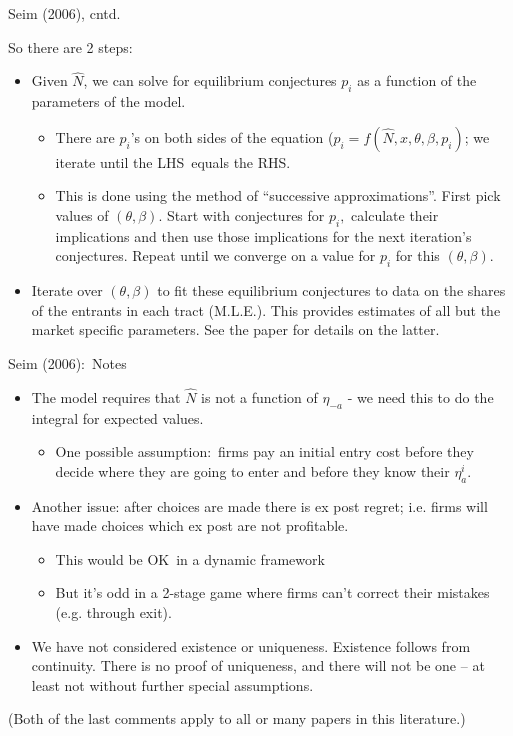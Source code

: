 \documentclass[xcolor=pdftex,dvipsnames,table,mathserif]{beamer}
\begin{document}
\begin{frame}{Seim (2006), cntd.}

So there are 2 steps:
\begin{itemize}
\item Given $\hat{N}$, we can solve for equilibrium conjectures $p_{i}$ as a
function of the parameters of the model.
\begin{itemize}
\item There are $p_{i}$'s on both sides of the equation ($p_{i}=f(\hat{N}%
,x,\theta ,\beta ,p_{i})$; we iterate until the LHS\ equals the RHS.
\item This is done using the method of \textquotedblleft successive
approximations\textquotedblright . First pick values of $(\theta ,\beta )$.
Start with conjectures for $p_{i},$ calculate their implications and then
use those implications for the next iteration's conjectures. Repeat until we
converge on a value for $p_{i}$ for this $(\theta ,\beta ).$
\end{itemize}
\item Iterate over $(\theta ,\beta )$ to fit these equilibrium conjectures
to data on the shares of the entrants in each tract (M.L.E.). This provides
estimates of all but the market specific parameters. See the paper for
details on the latter.
\end{itemize}
\end{frame}


\begin{frame}{Seim (2006):\ Notes}
\begin{itemize}
\item The model requires that $\hat{N}$ is not a function of $\eta _{-a}$ -
we need this to do the integral for expected values.
\begin{itemize}
\item One possible assumption:\ firms pay an initial entry cost before they
decide where they are going to enter and before they know their $\eta
_{a}^{i}$.
\end{itemize}
\item Another issue: after choices are made there is ex post regret; i.e.
firms will have made choices which ex post are not profitable.
\begin{itemize}
\item This would be OK\ in a dynamic framework
\item But it's odd in a 2-stage game where firms can't correct their
mistakes (e.g. through exit).
\end{itemize}
\item We have not considered existence or uniqueness. Existence follows from
continuity. There is no proof of uniqueness, and there will not be one -- at
least not without further special assumptions.
\end{itemize}
(Both of the last comments apply to all or many papers in this literature.)
\end{frame}%
\end{document}
